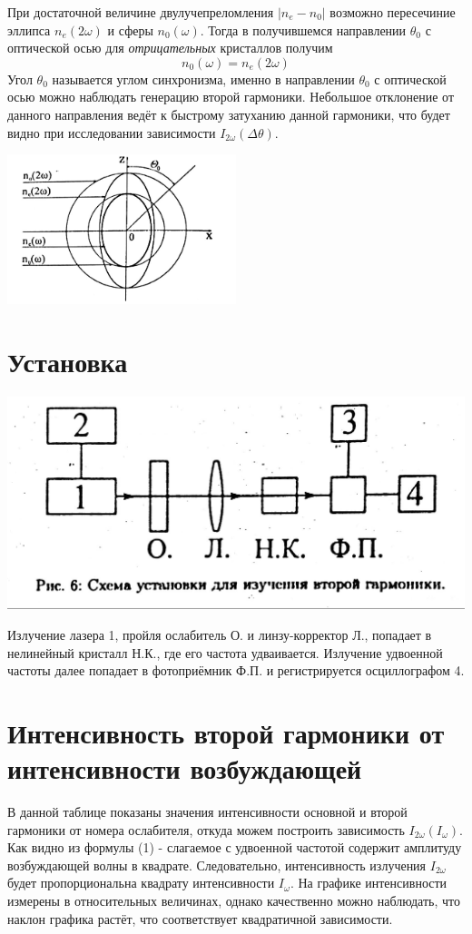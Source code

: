\documentclass[a4paper,14pt]{article} %
\begin{document}
При достаточной величине двулучепреломления $|n_e - n_0|$ возможно пересечиние эллипса $n_e(2 \omega)$ и сферы $n_0(\omega)$. Тогда в получившемся направлении $\theta_0$ с оптической осью для \textit{отрицательных} кристаллов получим
\begin{equation}
n_0(\omega) = n_e(2 \omega)
\end{equation}
Угол $\theta_0$ называется углом синхронизма, именно в направлении $\theta_0$ с оптической осью можно наблюдать генерацию второй гармоники. Небольшое отклонение от данного направления ведёт к быстрому затуханию данной гармоники, что будет видно при исследовании зависимости $I_{2 \omega} (\Delta \theta)$.

\begin{center}
\includegraphics[width = 0.5\textwidth]{images/ellips}\\
\end{center}


\section{Установка}
\begin{center}
\includegraphics[width = 0.5 \textwidth]{images/setup.jpg}
\end{center}
Излучение лазера 1, пройля ослабитель О. и линзу-корректор Л., попадает в нелинейный кристалл Н.К., где его частота удваивается. Излучение удвоенной частоты далее попадает в фотоприёмник Ф.П. и регистрируется осциллографом 4.

\section{Интенсивность второй гармоники от интенсивности возбуждающей}
В данной таблице показаны значения интенсивности основной и второй гармоники от номера ослабителя, откуда можем построить зависимость $I_{2 \omega} (I_{\omega})$.\\
Как видно из формулы (1) - слагаемое с удвоенной частотой содержит амплитуду возбуждающей волны в квадрате. Следовательно, интенсивность излучения $I_{2 \omega}$ будет пропорциональна квадрату интенсивности $I_{\omega}$.
На графике интенсивности измерены в относительных величинах, однако качественно можно наблюдать, что наклон графика растёт, что соответствует квадратичной зависимости.
\end{document}
